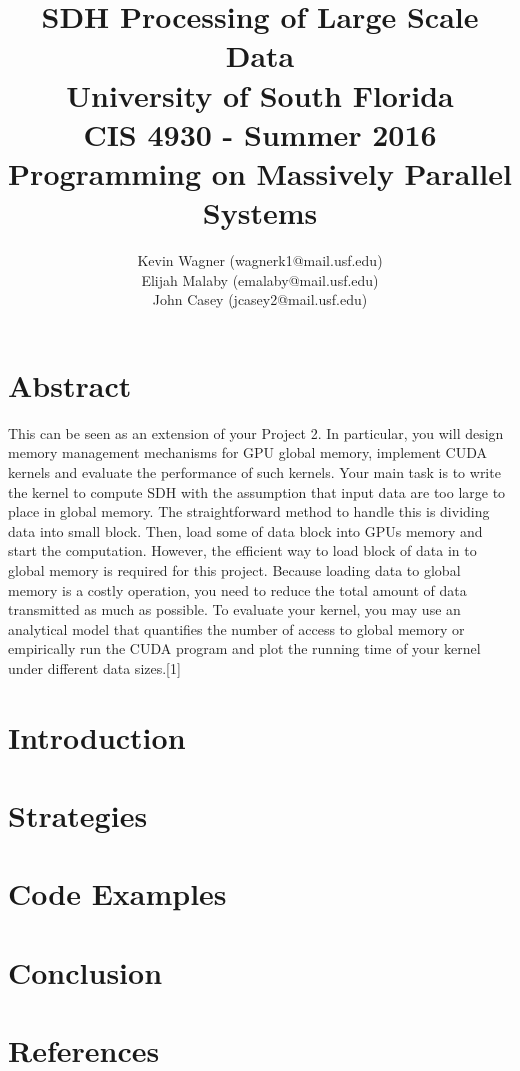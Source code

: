 \documentclass{article}
\title{SDH Processing of Large Scale Data\\
	   University of South Florida\\
	   CIS 4930 - Summer 2016\\
	   Programming on Massively Parallel Systems
}
\author{Kevin Wagner (wagnerk1@mail.usf.edu)\\
		Elijah Malaby (emalaby@mail.usf.edu)\\
		John Casey (jcasey2@mail.usf.edu)}
\begin{document}
  \maketitle
  \newpage
  \tableofcontents
  \newpage

\section{\textbf{Abstract}}
	This can be seen as an extension of your Project 2. In particular, you will design memory management mechanisms for GPU global memory, implement CUDA kernels and evaluate the performance of such kernels. Your main task is to write the kernel to compute SDH with the assumption that input data are too large to place in global memory. The straightforward method to handle this is dividing data into small block. Then, load some of data block into GPUs memory and start the computation. However, the efficient way to load block of data in to global memory is required for this project. Because loading data to global memory is a costly operation, you need to reduce the total amount of data transmitted as much as possible. To evaluate your kernel, you may use an analytical model that quantifies the number of access to global memory or empirically run the CUDA program and plot the running time of your kernel under different data sizes.[1]
	
\section{\textbf{Introduction}}
\section{\textbf{Strategies}}
\section{\textbf{Code Examples}}
\section{\textbf{Conclusion}}
\section{\textbf{References}}
\end{document}
